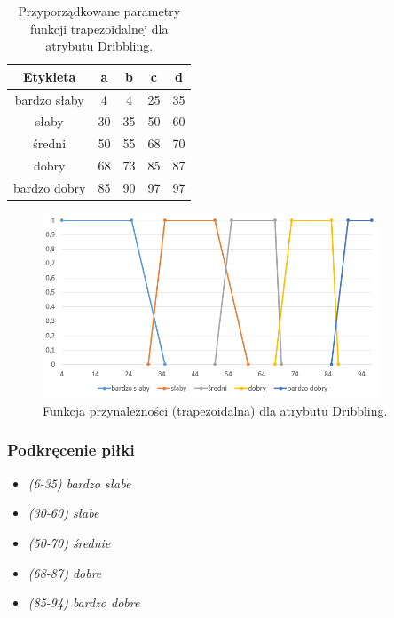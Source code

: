 \documentclass{classrep}
\begin{document}
	\begin{table}[h!]
		\centering
		\begin{tabular} {c c c c c}
			\hline
			\textbf{Etykieta} & \textbf{a} & \textbf{b} & \textbf{c} & \textbf{d} \\ [0.5ex] 
			\hline	
			\hline 
			bardzo słaby & 4 & 4 & 25 &	35 \\
			słaby & 30 & 35 & 50 & 60  \\
			średni & 50 & 55 & 68 & 70  \\
			dobry & 68 & 73 & 85 & 87  \\
			bardzo dobry & 85 & 90 & 97 & 97  \\		
			\hline
		\end{tabular}
		\caption{Przyporządkowane parametry funkcji trapezoidalnej dla atrybutu Dribbling. }
		\label{tabelaDribbling}
	\end{table}
	
	\begin{figure}[h!]
		\centering
		\includegraphics[width=0.9\textwidth]{zmienne/6.png}
		\caption{Funkcja przynależności (trapezoidalna) dla atrybutu Dribbling.}
		\label{wykresDribbling}
	\end{figure}
	
	
	\newpage
	\subsubsection{Podkręcenie piłki}
	\begin{itemize}
		\item \textsl{(6-35) bardzo słabe}
		\item \textsl{(30-60) słabe}
		\item \textsl{(50-70) średnie}
		\item \textsl{(68-87) dobre}
		\item \textsl{(85-94) bardzo dobre}
	\end{itemize}
	
\end{document}
